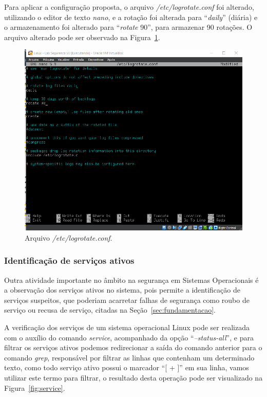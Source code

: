 \documentclass[
    12pt,				%
    oneside,   	        %
    a4paper,			%
    english,			%
    french,				%
    spanish,			%
    brazil,				%
    ]{pacotes/abntex2}
\begin{document}
Para aplicar a configuração proposta, o arquivo \textit{/etc/logrotate.conf} foi alterado, utilizando o editor de texto \textit{nano}, e a rotação foi alterada para ``\textit{daily}'' (diária) e o armazenamento foi alterado para ``\textit{rotate} 90'', para armazenar 90 rotações. O arquivo alterado pode ser observado na Figura~\ref{fig:logrotate}.

\begin{figure}[H]
  \centering
  \includegraphics[scale=0.7]{figuras/logrotate.png}
  \caption{Arquivo \textit{/etc/logrotate.conf}.}
  \label{fig:logrotate}
\end{figure}

\subsubsection{Identificação de serviços ativos}

Outra atividade importante no âmbito na segurança em Sistemas Operacionais é a observação dos serviços ativos no sistema, pois permite a identificação de serviços suspeitos, que poderiam acarretar falhas de segurança como roubo de serviço ou recusa de serviço, citadas na Seção~\ref{sec:fundamentacao}.

A verificação dos serviços de um sistema operacional Linux pode ser realizada com o auxílio do comando \textit{service}, acompanhado da opção ``\textit{--status-all}'', e para filtrar os serviços ativos podemos redirecionar a saída do comando anterior para o comando \textit{grep}, responsável por filtrar as linhas que contenham um determinado texto, como todo serviço ativo possui o marcador ``[ + ]'' em sua linha, vamos utilizar este termo para filtrar, o resultado desta operação pode ser visualizado na Figura~\ref{fig:service}.
\end{document}
